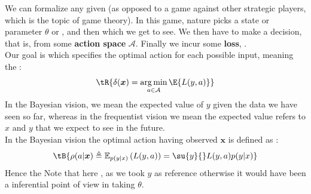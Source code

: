 We can formalize any given  (as 
opposed to a game against other strategic players, which is the topic of game theory).
In this game, nature picks a state or parameter $\theta$ or , and then  which we get to see. We
then have to make a decision, that is,  from some 
\textbf{action space} $\mathcal{A}$. Finally we incur some \textbf{loss}, .\\
Our goal is  which specifies the optimal
action for each possible input, meaning the :
$$ \tR{\delta(\bm{x}) = \argmin_{{a\in \mathcal{A}}} \E{{L(y, a)}}} $$
In the Bayesian vision, we mean the expected value of $y$ given the data we have seen so far, 
whereas in the frequentist vision we mean the expected value refers to $x$ and $y$ that we expect
to see in the future.\\
In the Bayesian vision the optimal action having observed $\bm{x}$ is defined as 
:
$$ \tB{\rho(a|\bm{x})\triangleq\mathbb{E}_{p(y|x)}\left(L(y, a)\right) = \su{y}{}L(y,
a) p(y|x)}$$
Hence the 
Note that here , as we took $y$ as reference otherwise it 
would have been a inferential point of view in taking $\theta$.

